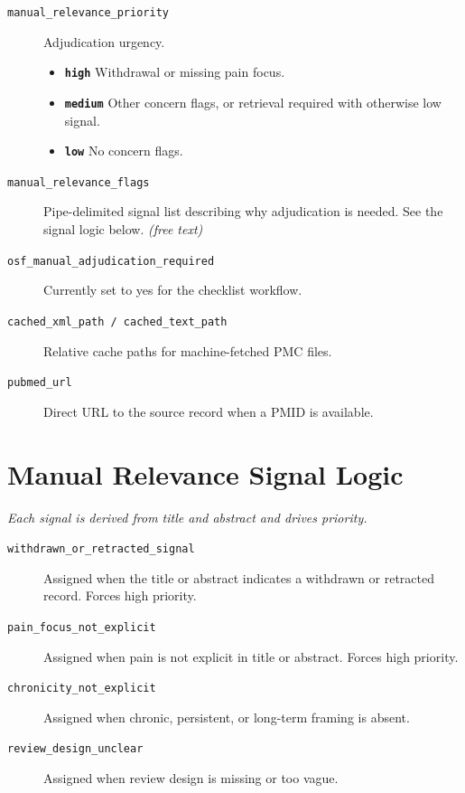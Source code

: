 \documentclass[11pt]{article}
\begin{document}
\begin{description}
\begin{itemize}[leftmargin=1.3em,itemsep=2pt,topsep=2pt]
  \end{itemize}
\item[\texttt{manual\_relevance\_priority}] Adjudication urgency.
  \begin{itemize}[leftmargin=1.3em,itemsep=2pt,topsep=2pt]
  \item \textbf{\texttt{high}} Withdrawal or missing pain focus.
  \item \textbf{\texttt{medium}} Other concern flags, or retrieval required with otherwise low signal.
  \item \textbf{\texttt{low}} No concern flags.
  \end{itemize}
\item[\texttt{manual\_relevance\_flags}] Pipe-delimited signal list describing why adjudication is needed. See the signal logic below. \textit{(free text)}
\item[\texttt{osf\_manual\_adjudication\_required}] Currently set to yes for the checklist workflow.
\item[\texttt{cached\_xml\_path / cached\_text\_path}] Relative cache paths for machine-fetched PMC files.
\item[\texttt{pubmed\_url}] Direct URL to the source record when a PMID is available.
\end{description}

\section*{Manual Relevance Signal Logic}
{\small\itshape Each signal is derived from title and abstract and drives priority.}\par\smallskip
\begin{description}
\item[\texttt{withdrawn\_or\_retracted\_signal}] Assigned when the title or abstract indicates a withdrawn or retracted record. Forces high priority.
\item[\texttt{pain\_focus\_not\_explicit}] Assigned when pain is not explicit in title or abstract. Forces high priority.
\item[\texttt{chronicity\_not\_explicit}] Assigned when chronic, persistent, or long-term framing is absent.
\item[\texttt{review\_design\_unclear}] Assigned when review design is missing or too vague.
\end{description}
\end{document}
